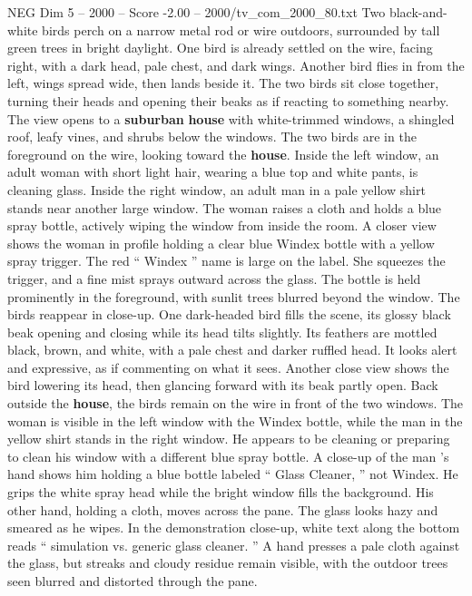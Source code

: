 \begin{textsample}{NEG Dim 5 – 2000 – Score -2.00 – 2000/tv\_com\_2000\_80.txt}  \label{ex:f5_neg_074}
Two black-and-white birds perch on a narrow metal rod or wire outdoors, surrounded by tall green trees in bright daylight.
One bird is already settled on the wire, facing right, with a dark head, pale chest, and dark wings.
Another bird flies in from the left, wings spread wide, then lands beside it.
The two birds sit close together, turning their heads and opening their beaks as if reacting to something nearby.
The view opens to a \textbf{suburban} \textbf{house} with white-trimmed windows, a shingled roof, leafy vines, and shrubs below the windows.
The two birds are in the foreground on the wire, looking toward the \textbf{house}.
Inside the left window, an adult woman with short light hair, wearing a blue top and white pants, is cleaning glass.
Inside the right window, an adult man in a pale yellow shirt stands near another large window.
The woman raises a cloth and holds a blue spray bottle, actively wiping the window from inside the room.
A closer view shows the woman in profile holding a clear blue Windex bottle with a yellow spray trigger.
The red “ Windex ” name is large on the label.
She squeezes the trigger, and a fine mist sprays outward across the glass.
The bottle is held prominently in the foreground, with sunlit trees blurred beyond the window.
The birds reappear in close-up.
One dark-headed bird fills the scene, its glossy black beak opening and closing while its head tilts slightly.
Its feathers are mottled black, brown, and white, with a pale chest and darker ruffled head.
It looks alert and expressive, as if commenting on what it sees.
Another close view shows the bird lowering its head, then glancing forward with its beak partly open.
Back outside the \textbf{house}, the birds remain on the wire in front of the two windows.
The woman is visible in the left window with the Windex bottle, while the man in the yellow shirt stands in the right window.
He appears to be cleaning or preparing to clean his window with a different blue spray bottle.
A close-up of the man ’s hand shows him holding a blue bottle labeled “ Glass Cleaner, ” not Windex.
He grips the white spray head while the bright window fills the background.
His other hand, holding a cloth, moves across the pane.
The glass looks hazy and smeared as he wipes.
In the demonstration close-up, white text along the bottom reads “ simulation vs. generic glass cleaner. ” A hand presses a pale cloth against the glass, but streaks and cloudy residue remain visible, with the outdoor trees seen blurred and distorted through the pane.

\end{textsample}
